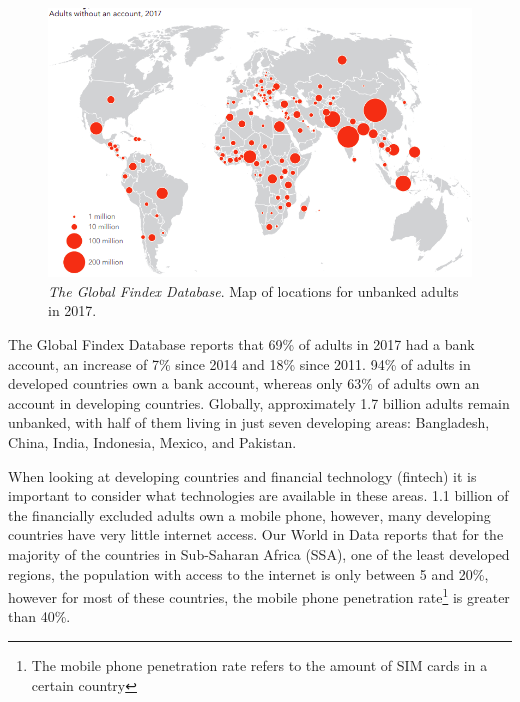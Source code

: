 \documentclass[11pt, a4paper]{article}
\begin{document}
\begin{figure}[ht]
\centering
\includegraphics[width=1\linewidth]{figs/unbanked_map}
\caption{\textit{The Global Findex Database}. Map of locations for unbanked adults in 2017.}
\label{fig: unbanked_map}
\end{figure}
\clearpage

The Global Findex Database reports that 69\% of adults in 2017 had a bank account\cite{gfindex}, an increase of 7\% since 2014 and 18\% since 2011\cite{gfindex}. 94\% of adults in developed countries own a bank account, whereas only 63\% of adults own an account in developing countries\cite{gfindex}. Globally, approximately 1.7 billion adults remain unbanked, with half of them living in just seven developing areas: Bangladesh, China, India, Indonesia, Mexico, and Pakistan.

When looking at developing countries and financial technology (fintech) it is important to consider what technologies are available in these areas. 1.1 billion of the financially excluded adults own a mobile phone\cite{gfindex}, however, many developing countries have very little internet access. Our World in Data reports that for the majority of the countries in Sub-Saharan Africa (SSA), one of the least developed regions, the population with access to the internet is only between 5 and 20\%\cite{owidinternet}, however for most of these countries, the mobile phone penetration rate\footnote{The mobile phone penetration rate refers to the amount of SIM cards in a certain country} is greater than 40\%\cite{owidinternet}.
\end{document}
